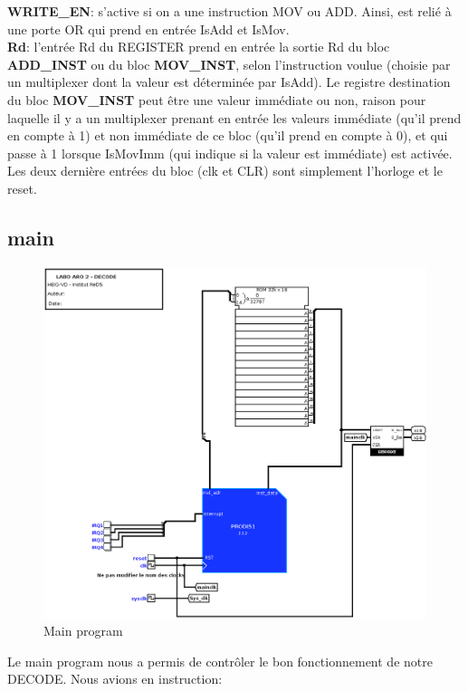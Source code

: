 \documentclass[a4paper]{article} %
\begin{document}
\textbf{WRITE\_EN}: s'active si on a une instruction MOV ou ADD. Ainsi, est relié à une porte OR qui prend en entrée IsAdd et IsMov.
\medskip \\
\textbf{Rd}: l'entrée Rd du REGISTER prend en entrée la sortie Rd du bloc \textbf{ADD\_INST} ou du bloc \textbf{MOV\_INST}, selon l'instruction voulue (choisie par un multiplexer dont la valeur est déterminée par IsAdd). Le registre destination du bloc \textbf{MOV\_INST} peut être une valeur immédiate ou non, raison pour laquelle il y a un multiplexer prenant en entrée les valeurs immédiate (qu'il prend en compte à 1) et non immédiate de ce bloc (qu'il prend en compte à 0), et qui passe à 1 lorsque IsMovImm (qui indique si la valeur est immédiate) est activée.
\medskip \\
Les deux dernière entrées du bloc (clk et CLR) sont simplement l'horloge et le reset.



\subsection{main}
\begin{figure}[H]
    \centering
    \includegraphics[width=1\textwidth]{src/main.png}
    \caption{Main program}
    \label{main_img}
\end{figure}

Le main program  nous a permis de contrôler le bon fonctionnement de notre DECODE. Nous avions en instruction:
\end{document}
